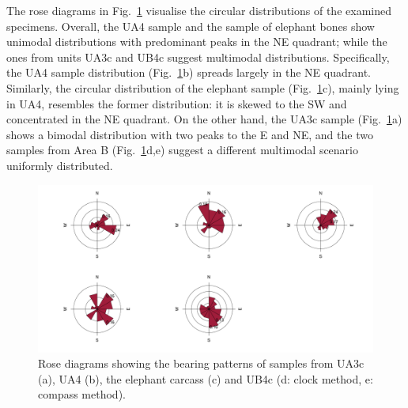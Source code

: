 \documentclass[preprint,authoryear,times]{elsarticle} %
\begin{document}

The rose diagrams in Fig.~\ref{fig:6} visualise the circular distributions of the examined specimens. Overall, the UA4 sample and the sample of elephant bones show unimodal distributions with predominant peaks in the NE quadrant; while the ones from units UA3c and UB4c suggest multimodal distributions. Specifically, the UA4 sample distribution (Fig.~\ref{fig:6}b) spreads largely in the NE quadrant. Similarly, the circular distribution of the elephant sample (Fig.~\ref{fig:6}c), mainly lying in UA4, resembles the former distribution: it is skewed to the SW and concentrated in the NE quadrant. On the other hand, the UA3c sample (Fig.~\ref{fig:6}a) shows a bimodal distribution with two peaks to the E and NE, and the two samples from Area B (Fig.~\ref{fig:6}d,e) suggest a different multimodal scenario uniformly distributed.

\begin{figure}[]
  \centering
  \includegraphics[width=1\textwidth]{../artwork/Fig6.pdf}
  \caption{Rose diagrams showing the bearing patterns of samples from UA3c (a), UA4 (b), the elephant carcass (c) and UB4c (d: clock method, e: compass method).}
  \label{fig:6}
\end{figure}
\end{document}
